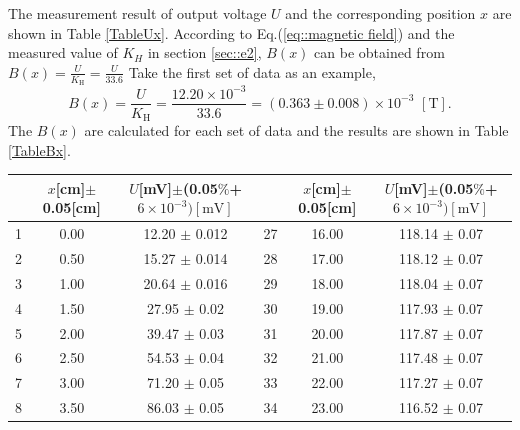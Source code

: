 \documentclass[a4paper]{article}
\begin{document}
The measurement result of output voltage $U$ and the corresponding position $x$ are shown in Table \ref{TableUx}. According to Eq.(\ref{eq::magnetic field}) and the
measured value of $K_{H}$ in section \ref{sec::e2}, $B(x)$ can be obtained from $B(x) = \frac{U}{K_\text{H}} = \frac{U}{33.6}$
Take the first set of data as an example, $$B(x) = \frac{U}{K_\text{H}} = \frac{12.20\times 10^{-3}}{33.6} = (0.363 \pm 0.008) \times 10^{-3} \,\,[\text{T}].$$
The $B(x)$ are calculated for each set of data and the results are shown in Table \ref{TableBx}.

\begin{table}[htbp]
	\centering
	\begin{tabular}{ccc||ccc}
		\hline
		   & $x$[cm]$\pm$0.05[cm] & $U$[mV]$\pm$(0.05$\%$+$6 \times 10^{-3})[\text{mV}]$ &    & $x$[cm]$\pm$0.05[cm] & $U$[mV]$\pm$(0.05$\%$+$6 \times 10^{-3})[\text{mV}]$ \\
		\hline
		1  & 0.00                 & 12.20 $\pm$ 0.012                                    & 27 & 16.00                & 118.14 $\pm$ 0.07                                    \\
		2  & 0.50                 & 15.27 $\pm$ 0.014                                    & 28 & 17.00                & 118.12 $\pm$ 0.07                                    \\
		3  & 1.00                 & 20.64 $\pm$ 0.016                                    & 29 & 18.00                & 118.04 $\pm$ 0.07                                    \\
		4  & 1.50                 & 27.95 $\pm$ 0.02                                     & 30 & 19.00                & 117.93 $\pm$ 0.07                                    \\
		5  & 2.00                 & 39.47 $\pm$ 0.03                                     & 31 & 20.00                & 117.87 $\pm$ 0.07                                    \\
		6  & 2.50                 & 54.53 $\pm$ 0.04                                     & 32 & 21.00                & 117.48 $\pm$ 0.07                                    \\
		7  & 3.00                 & 71.20 $\pm$ 0.05                                     & 33 & 22.00                & 117.27 $\pm$ 0.07                                    \\
		8  & 3.50                 & 86.03 $\pm$ 0.05                                     & 34 & 23.00                & 116.52 $\pm$ 0.07                                    \\

\end{tabular}
\end{table}
\end{document}

